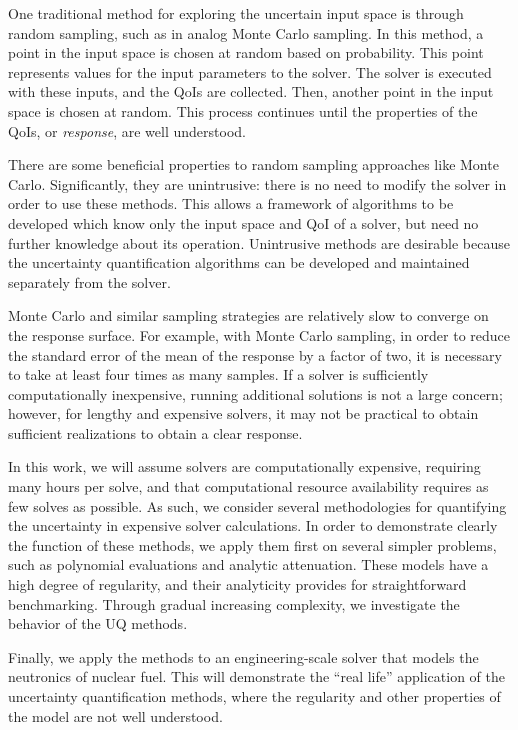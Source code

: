 One traditional method for exploring the uncertain input space is through random sampling, such as in analog Monte
Carlo sampling.  In this method, a point in the input space is chosen at random based on probability.  This
point represents values for the input parameters to the solver.  The solver is executed with these inputs, and
the QoIs are collected.  Then, another point in the input space is chosen at random.  This process continues
until the properties of the QoIs, or \emph{response}, are well understood.

There are some beneficial properties to random sampling approaches like Monte Carlo.  
Significantly, they are unintrusive:
 there is no need to modify the solver in order to use these methods.  This allows a framework of
algorithms to be developed which know only the input space and QoI of a solver, but need no further knowledge
about its operation.  Unintrusive methods are desirable because the uncertainty quantification algorithms can
be developed and maintained separately from the solver.

Monte Carlo and similar sampling strategies are relatively slow to converge on the response surface.  For
example, with Monte Carlo sampling, in order to reduce the standard error of the mean of the response by a factor
of two, it is necessary to take at least four times as many samples.  If a solver is sufficiently computationally
inexpensive, running additional solutions is not a large concern; however, for lengthy and expensive solvers,
it may not be practical to obtain sufficient realizations to obtain a clear response.

In this work, we will assume solvers are computationally expensive, requiring many hours per solve, and that
computational resource availability requires as few solves as possible.  As such, we consider several methodologies 
for quantifying the uncertainty in expensive solver
calculations.  In order to demonstrate clearly the function of these methods, we apply them first on
several simpler problems, such as polynomial evaluations and analytic attenuation.  These models have a high
degree of regularity, and their analyticity provides for straightforward benchmarking.  Through gradual
increasing complexity, we investigate the behavior of the UQ methods.

Finally, we apply the methods to an engineering-scale solver that
models the neutronics of nuclear fuel.  This will
demonstrate the ``real life'' application of the uncertainty quantification methods, where the regularity and
other properties of the model are not well understood.

